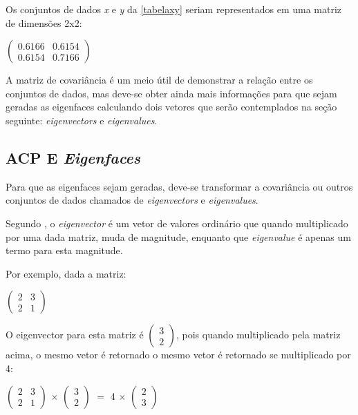 Os conjuntos de dados \textit{x} e \textit{y} da \autoref{tabelaxy} seriam representados em uma matriz de dimensões 2x2:

\begin{center}
	$\begin{pmatrix} 0.6166 & 0.6154 \\ 0.6154 & 0.7166 \end{pmatrix}$
\end{center}


A matriz de covariância é um meio útil de demonstrar a relação entre os conjuntos de dados, mas deve-se obter ainda mais informações para que sejam geradas as eigenfaces calculando dois vetores que serão contemplados na seção seguinte: \textit{eigenvectors} e \textit{eigenvalues}.

\subsection{ACP E \textit{Eigenfaces}}\label{subsec:acp-eigen}

Para que as eigenfaces sejam geradas, deve-se transformar a covariância ou outros conjuntos de dados chamados de \textit{eigenvectors} e \textit{eigenvalues}.

Segundo \cite{drmathew_java_programming}, o \textit{eigenvector} é um vetor de valores ordinário que quando multiplicado por uma dada matriz, muda de magnitude, enquanto que \textit{eigenvalue} é apenas um termo para esta magnitude. 

Por exemplo, dada a matriz:

\begin{center}
	$\begin{pmatrix} 2 & 3 \\ 2 & 1 \end{pmatrix}$
\end{center}

O eigenvector para esta matriz é $\begin{pmatrix} 3 \\ 2\end{pmatrix}$, pois quando multiplicado pela matriz acima, o mesmo vetor é retornado o mesmo vetor é retornado se multiplicado por 4:

\begin{center}
	$\begin{pmatrix} 2 & 3 \\ 2 & 1 \end{pmatrix}$ $\times$ $\begin{pmatrix} 3 \\ 2 \end{pmatrix}$ $=$ $4$ $\times$ $\begin{pmatrix} 2 \\ 3\end{pmatrix}$
\end{center}

